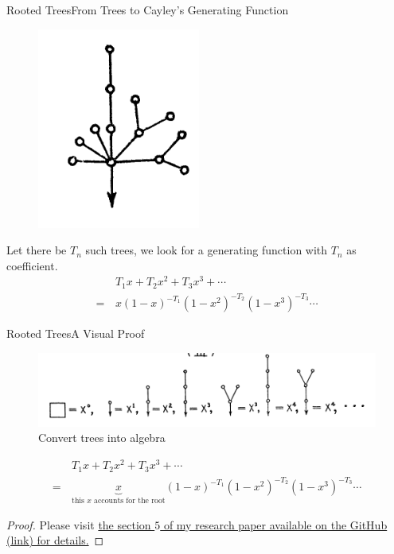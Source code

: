 \documentclass{beamer}
\begin{document}
    \begin{frame}{Rooted Trees}{From Trees to Cayley’s Generating Function}
        \begin{figure}
            \centering
            \includegraphics[scale=0.5]{images/rooted-tree.png}
            \label{fig:rooted-tree}
        \end{figure}
        Let there be $T_n$ such trees, we look for a generating function with 
        $T_n$ as coefficient.
        \begin{align} %
            & T_1x + T_2 x^2 + T_3 x^3 +\cdots \\
            =\,  & x(1-x)^{-T_1}(1-x^2)^{-T_2}(1-x^3)^{-T_3}\cdots
        \end{align}
    \end{frame}
    
    \begin{frame}{Rooted Trees}{A Visual Proof}
        \begin{figure}
            \centering
            \includegraphics[scale=0.5]{images/tree5.png}
            \caption{Convert trees into algebra}
            \label{fig:enter-label}
        \end{figure}
        \begin{align*}
            & T_1x + T_2 x^2 + T_3 x^3 +\cdots \\
            =\,  & \underbrace{x}_{\text{this $x$ accounts for the root}}(1-x)^{-T_1}(1-x^2)^{-T_2}(1-x^3)^{-T_3}\cdots
        \end{align*}
        \begin{proof}
            Please visit \href {https://github.com/ethan201not404/Math-Mentorship-2024/blob/main/2024MathMentorshipByEthanLi.pdf}{the section $5$ of my research paper available on the GitHub (link) for details.}
        \end{proof}
        
    \end{frame}
\end{document}
